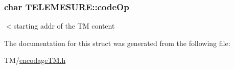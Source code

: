 \subsubsection[{\texorpdfstring{code\+Op}{codeOp}}]{\setlength{\rightskip}{0pt plus 5cm}char T\+E\+L\+E\+M\+E\+S\+U\+R\+E\+::code\+Op}\hypertarget{structTELEMESURE_a3aea5127821a1b646d11552886bee0c6}{}\label{structTELEMESURE_a3aea5127821a1b646d11552886bee0c6}
$<$starting addr of the TM content 

The documentation for this struct was generated from the following file\+:\begin{DoxyCompactItemize}
\item 
T\+M/\hyperlink{encodageTM_8h}{encodage\+T\+M.\+h}\end{DoxyCompactItemize}
